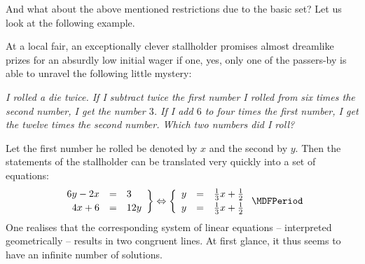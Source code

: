 \begin{MIntro}
And what about the above mentioned restrictions due to the basic set? 
Let us look at the following example.

\begin{MExample}
At a local fair, an exceptionally clever stallholder promises almost dreamlike prizes for an absurdly low initial wager if one, yes, only one of the passers-by is able to unravel the 
following little mystery:

\textit{I rolled a 
die twice. If I subtract twice the first number I rolled from six times
the second number, I get the number $3$. If I add $6$ to four times the first number, I get the twelve times the second number. Which two numbers did I roll?}

Let the first number he rolled be denoted by $x$ and the second by $y$. 
Then the statements of the stallholder can be translated very quickly into a set of equations:
$$\left. \begin{array}{rcl} 6 y - 2 x & = & 3 \\[.5ex] 4 x + 6 & = & 12 y \end{array} \right\} \Leftrightarrow
\left\{ \begin{array}{rcl} y & = & \Mtfrac13 x + \Mtfrac12 \\[.5ex]
y & = & \Mtfrac13 x + \Mtfrac12 \end{array} \right. \MDFPeriod $$
One realises that the corresponding system of linear equations -- interpreted geometrically -- 
results in two congruent lines. At first glance, it thus seems to have an infinite number
of solutions.


\end{MExample}
\end{MIntro}
